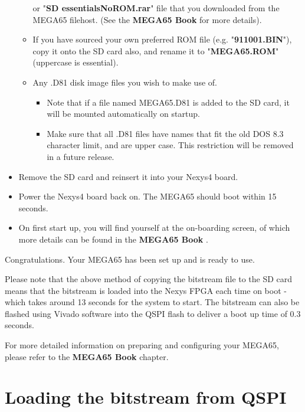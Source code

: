 \begin{itemize}
\begin{itemize}
	      or "\textbf{SD essentialsNoROM.rar}" file that you downloaded from
		  the MEGA65 filehost. (See
\ifdefined\printmanual
the {\bf MEGA65 Book}
\else
{}
\fi
		  for more details).
    \item{If you have sourced your own preferred ROM file} (e.g. "\textbf{911001.BIN}"), copy it onto the SD card also, and rename it to "\textbf{MEGA65.ROM}" (uppercase is essential).
    \item{Any .D81 disk image files} you wish to make use of.
      \begin{itemize}
        \item Note that if a file named MEGA65.D81 is added to the SD card, it will be mounted automatically on startup.
        \item Make sure that all .D81 files have names that fit the old DOS 8.3 character limit, and are upper case.  This restriction will be removed in a future release.
      \end{itemize}
  \end{itemize}
\item{Remove the SD card} and reinsert it into your Nexys4 board.
\item{Power the Nexys4} board back on.  The MEGA65 should boot within 15 seconds.
\item On first start up, you will find yourself at the on-boarding screen, of which more
    details can be found in
\ifdefined\printmanual
the {\bf MEGA65 Book}
\else
{}
\fi
.

\end{itemize}

Congratulations. Your MEGA65 has been set up and is ready to use.

Please note that the above method of copying the bitstream file to the SD card means that the bitstream is loaded into the Nexys FPGA each time on boot - which takes around 13 seconds for the system to start. The bitstream can also be flashed using Vivado software into the QSPI flash to deliver a boot up time of 0.3 seconds. 

For more detailed information on preparing and configuring your MEGA65, please refer
to
\ifdefined\printmanual
the {\bf MEGA65 Book}
\else
{}
\fi
chapter. 

\section{Loading the bitstream from QSPI}

